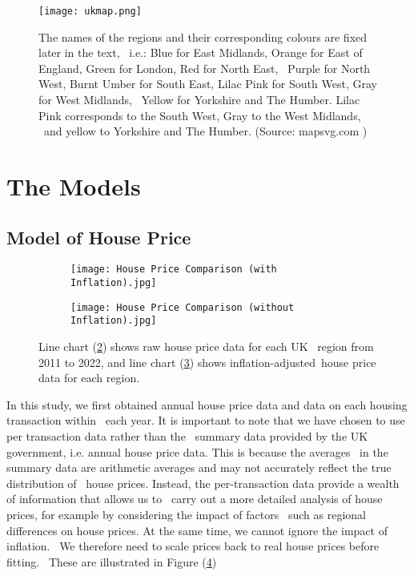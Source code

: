 \documentclass[12pt]{article}  %
\begin{document}
\begin{figure}
    \centering
    \texttt{[image: ukmap.png]}
    \caption{The names of the regions and their corresponding colours are fixed later in the text, \
    i.e.: Blue for East Midlands, Orange for East of England, Green for London, Red for North East, \
    Purple for North West, Burnt Umber for South East, Lilac Pink for South West, Gray for West Midlands, \
    Yellow for Yorkshire and The Humber. Lilac Pink corresponds to the South West, Gray to the West Midlands, \
    and yellow to Yorkshire and The Humber. (Source: mapsvg.com \textsuperscript{\cite{map}})}\label{fig:ukmap}
\end{figure}


\section{The Models}
\subsection{Model of House Price}

\begin{figure}[htbp]
    \centering
    \begin{subfigure}[b]{.45\textwidth}
    \texttt{[image: House Price Comparison (with Inflation).jpg]}
    \caption{}\label{subfig:Inflation}
\end{subfigure}
\begin{subfigure}[b]{.45\textwidth}
    \texttt{[image: House Price Comparison (without Inflation).jpg]}
    \caption{}\label{subfig:noInflation}
\end{subfigure}
\caption{Line chart (\ref{subfig:Inflation}) shows raw house price data for each UK \
region from 2011 to 2022, and line chart (\ref{subfig:noInflation}) shows inflation-adjusted\
house price data for each region.}\label{fig:houseprice}
\end{figure}
In this study, we first obtained annual house price data and data on each housing transaction within \
each year. It is important to note that we have chosen to use per transaction data rather than the \
summary data provided by the UK government, i.e. annual house price data. This is because the averages \
in the summary data are arithmetic averages and may not accurately reflect the true distribution of \
house prices. Instead, the per-transaction data provide a wealth of information that allows us to \
carry out a more detailed analysis of house prices, for example by considering the impact of factors \
such as regional differences on house prices. At the same time, we cannot ignore the impact of inflation. \
We therefore need to scale prices back to real house prices before fitting. \
These are illustrated in Figure (\ref{fig:houseprice})
\end{document}

